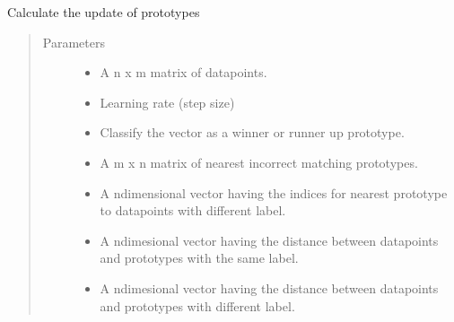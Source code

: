 \documentclass[letterpaper,10pt,english]{sphinxmanual}
\begin{document}
\begin{fulllineitems}

\begin{fulllineitems}
\label{\detokenize{Renyi_final:Renyi_final.GLVQ.change_in_w_minus}}
\sphinxAtStartPar
Calculate the update of prototypes
\begin{quote}\begin{description}
\item[{Parameters}] \leavevmode\begin{itemize}
\item {} 
\sphinxAtStartPar
{} \textendash{} A n x m matrix of datapoints.

\item {} 
\sphinxAtStartPar
{} \textendash{} Learning rate (step size)

\item {} 
\sphinxAtStartPar
{} \textendash{} Classify the vector as a winner or runner up prototype.

\item {} 
\sphinxAtStartPar
{} \textendash{} A m x n matrix of nearest incorrect matching prototypes.

\item {} 
\sphinxAtStartPar
{} \textendash{} A n\sphinxhyphen{}dimensional vector having the indices for nearest prototype to datapoints with different label.

\item {} 
\sphinxAtStartPar
{} \textendash{} A n\sphinxhyphen{}dimesional vector having the distance between datapoints and prototypes with the same label.

\item {} 
\sphinxAtStartPar
{} \textendash{} A n\sphinxhyphen{}dimesional vector having the distance between datapoints and prototypes with different label.


\end{itemize}
\end{description}
\end{quote}
\end{fulllineitems}
\end{fulllineitems}
\end{document}
